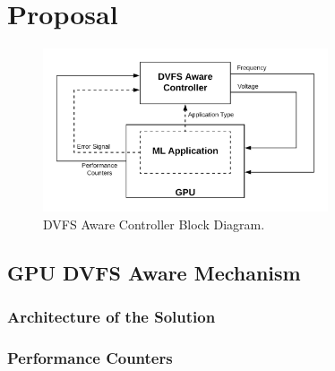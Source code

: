 
\chapter{Proposal}
\label{chapter:implementation}


\begin{figure}[!htb]
  \centering
  \includegraphics[width=0.75\textwidth]{Figures/Proposel/Controller_Diagram.png}
  \caption[Controller]{DVFS Aware Controller Block Diagram.}
  \label{fig:controlerDVFSaware}
\end{figure}



\section{GPU DVFS Aware Mechanism}
\label{section:solarch}


\subsection{Architecture of the Solution}
\label{section:solarch}

\subsection{Performance Counters}
\label{section:solarch}

